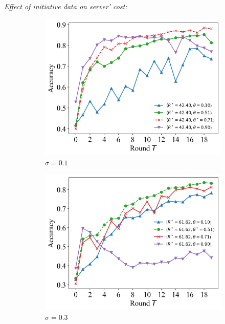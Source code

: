 \documentclass{article}
\theoremstyle{plain}
\theoremstyle{definition}
\theoremstyle{remark}
\begin{document}
\textit{Effect of initiative data on server' cost:}
\begin{figure}
	\begin{subfigure}{0.31\textwidth}
		\centering
    \includegraphics[width=\textwidth]{figures/figure_65_A.png}
    \caption{$\sigma=0.1$}
	\end{subfigure}
  \quad
	\begin{subfigure}{0.31\textwidth}
		\centering
		\includegraphics[width=\textwidth]{figures/figure_65_B.png}
    \caption{$\sigma=0.3$}
	\end{subfigure}
  \quad
  \begin{subfigure}{0.31\textwidth}
		\centering

\end{subfigure}
\end{figure}
\end{document}
